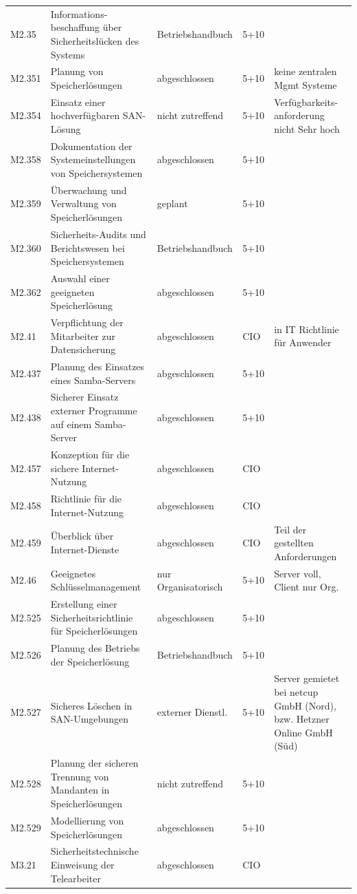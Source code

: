 \begin{longtable}{lp{3.7cm}p{3cm}lp{3.8cm}}
M2.35 & Informations-beschaffung über Sicherheitslücken des Systems & Betriebshandbuch & 5+10 &  \\
M2.351 & Planung von Speicherlösungen & abgeschlossen & 5+10 & keine zentralen Mgmt Systeme \\
M2.354 & Einsatz einer hochverfügbaren SAN-Lösung & nicht zutreffend & 5+10 & Verfügbarkeits-anforderung nicht Sehr hoch \\
M2.358 & Dokumentation der Systemeinstellungen von Speichersystemen & abgeschlossen & 5+10 &  \\
M2.359 & Überwachung und Verwaltung von Speicherlösungen & geplant & 5+10 &  \\
M2.360 & Sicherheits-Audits und Berichtswesen bei Speichersystemen & Betriebshandbuch & 5+10 &  \\
M2.362 & Auswahl einer geeigneten Speicherlösung & abgeschlossen & 5+10 &  \\
M2.41 & Verpflichtung der Mitarbeiter zur Datensicherung & abgeschlossen & CIO & in IT Richtlinie für Anwender \\
M2.437 & Planung des Einsatzes eines Samba-Servers & abgeschlossen & 5+10 &  \\
M2.438 & Sicherer Einsatz externer Programme auf einem Samba-Server & abgeschlossen & 5+10 &  \\
M2.457 & Konzeption für die sichere Internet-Nutzung & abgeschlossen & CIO &  \\
M2.458 & Richtlinie für die Internet-Nutzung & abgeschlossen & CIO &  \\
M2.459 & Überblick über Internet-Dienste & abgeschlossen & CIO & Teil der gestellten Anforderungen \\
M2.46 & Geeignetes Schlüsselmanagement & nur Organisatorisch & 5+10 & Server voll, Client nur Org. \\
M2.525 & Erstellung einer Sicherheitsrichtlinie für Speicherlösungen & abgeschlossen & 5+10 &  \\
M2.526 & Planung des Betriebs der Speicherlösung & Betriebshandbuch & 5+10 &  \\
M2.527 & Sicheres Löschen in SAN-Umgebungen & externer Dienstl. & 5+10 & Server gemietet bei netcup GmbH (Nord), bzw. Hetzner Online GmbH (Süd) \\
M2.528 & Planung der sicheren Trennung von Mandanten in Speicherlösungen & nicht zutreffend & 5+10 &  \\
M2.529 & Modellierung von Speicherlösungen & abgeschlossen & 5+10 &  \\
M3.21 & Sicherheitstechnische Einweisung der Telearbeiter & abgeschlossen & CIO &  \\

\end{longtable}
